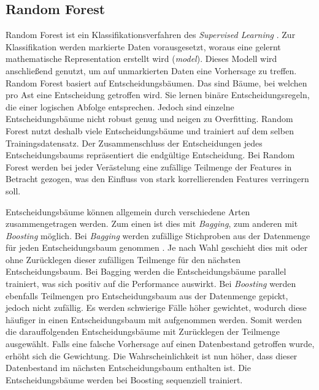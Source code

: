 \subsection{Random Forest}
\label{ch:Basics:se:ml:ss:randomForest}

Random Forest ist ein Klassifikationsverfahren des \textit{Supervised Learning} \cite{WaybackMachine2016}. 
Zur Klassifikation werden markierte Daten vorausgesetzt, woraus eine gelernt mathematische Representation erstellt wird (\textit{model}). 
Dieses Modell wird anschließend genutzt, um auf unmarkierten Daten eine Vorhersage zu treffen.
Random Forest basiert auf Entscheidungsbäumen. 
Das sind Bäume, bei welchen pro Ast eine Entscheidung getroffen wird.
Sie lernen binäre Entscheidungsregeln, die einer logischen Abfolge entsprechen.
Jedoch sind einzelne Entscheidungsbäume nicht robust genug und neigen zu Overfitting.
Random Forest nutzt deshalb viele Entscheidungsbäume und trainiert auf dem selben Trainingsdatensatz. 
Der Zusammenschluss der Entscheidungen jedes Entscheidungsbaums repräsentiert die endgültige Entscheidung.
Bei Random Forest werden bei jeder Verästelung eine zufällige Teilmenge der Features in Betracht gezogen, was den Einfluss von stark korrellierenden Features verringern soll.

Entscheidungsbäume können allgemein durch verschiedene Arten zusammengetragen werden. 
Zum einen ist dies mit \textit{Bagging}, zum anderen mit \textit{Boosting} möglich.
Bei \textit{Bagging} werden zufällige Stichproben aus der Datenmenge für jeden Entscheidungsbaum genommen \cite{jamesIntroductionStatisticalLearning2013}.
Je nach Wahl geschieht dies mit oder ohne Zurücklegen dieser zufälligen Teilmenge für den nächsten Entscheidungsbaum.
Bei Bagging werden die Entscheidungsbäume parallel trainiert, was sich positiv auf die Performance auswirkt.
Bei \textit{Boosting} werden ebenfalls Teilmengen pro Entscheidungsbaum aus der Datenmenge gepickt, jedoch nicht zufällig. 
Es werden schwierige Fälle höher gewichtet, wodurch diese häufiger in einen Entscheidungsbaum mit aufgenommen werden. 
Somit werden die darauffolgenden Entscheidungsbäume mit Zurücklegen der Teilmenge ausgewählt.
Falls eine falsche Vorhersage auf einen Datenbestand getroffen wurde, erhöht sich die Gewichtung.
Die Wahrscheinlichkeit ist nun höher, dass dieser Datenbestand im nächsten Entscheidungsbaum enthalten ist.
Die Entscheidungsbäume werden bei Boosting sequenziell trainiert.

